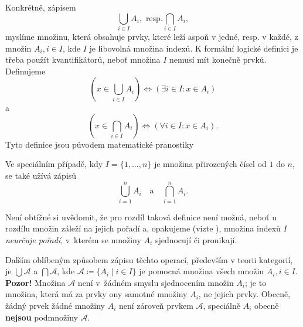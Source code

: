 Konkrétně, zápisem
\[
 \bigcup_{i \in I} A_i,\text{ resp.}\bigcap_{i \in I} A_i,
\]
myslíme množinu, která obsahuje prvky, které leží aspoň v jedné, resp. v každé,
z množin $A_i,i \in I$, kde $I$ je libovolná množina indexů. K formální logické
definici je třeba použít kvantifikátorů, neboť množina $I$ nemusí mít konečně
prvků. Definujeme
\[
 (x \in \bigcup_{i \in I} A_i) \Leftrightarrow (\exists i \in I:x \in A_i)
\]
a
\[
 (x \in \bigcap_{i \in I} A_i) \Leftrightarrow ( \forall i \in I:x \in A_i).
\]
Tyto definice jsou původem matematické pranostiky 

Ve speciálním případě, kdy $I = \{1,\ldots,n\}$ je množina přirozených čísel od
$1$ do $n$, se také užívá zápisů
\[
 \bigcup_{i = 1}^{n} A_i \quad \text{a} \quad \bigcap_{i = 1}^{n} A_i.
\]

Není obtížné si uvědomit, že pro rozdíl taková definice není možná, neboť u
rozdílu množin záleží na jejich pořadí a, opakujeme (vizte
), množina indexů $I$ \emph{neurčuje
pořadí}, v~kterém se množiny $A_i$ sjednocují či pronikají.

Dalším oblíbeným způsobem zápisu těchto operací, především v teorii kategorií,
je $\bigcup \mathcal{A}$ a $\bigcap \mathcal{A}$, kde $\mathcal{A} \coloneqq
\{A_i \mid i \in I\}$ je pomocná množina všech množin $A_i,i \in I$.
\textbf{Pozor!} Množina $\mathcal{A}$ není v~žádném smyslu sjednocením množin
$A_i$; je to množina, která má za prvky ony samotné množiny $A_i$, ne jejich
prvky. Obecně, žádný prvek žádné množiny $A_i$ není zároveň prvkem
$\mathcal{A}$, speciálně $A_i$ obecně \textbf{nejsou} podmnožiny $\mathcal{A}$.

